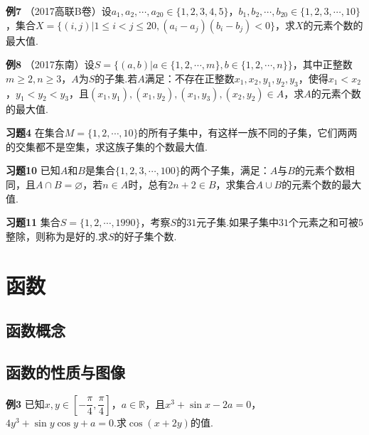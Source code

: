 \documentclass[lang=cn, zihao=4.5]{elegantbook}
\begin{document}
\vspace{30em}
\noindent %
	\textbf{例7} \quad （2017高联B卷）设$a_1,a_2, \cdots ,a_{20} \in \{  1,2,3,4,5  \}$，$b_1,b_2, \cdots ,b_{20} \in \{  1,2,3,\cdots ,10  \}$，集合$X=\{  (i,j)|1 \leq i < j \leq 20 , (a_i-a_j)(b_i-b_j)<0  \}$，求$X$的元素个数的最大值.
	
\newpage
\noindent %
	\textbf{例8} \quad （2017东南）设$S=\{  (a,b)|a \in \{ 1,2,\cdots ,m \},b \in \{ 
1,2, \cdots ,n \}  \}$，其中正整数$m \geq 2,n \geq 3$，$A$为$S$的子集.若$A$满足：不存在正整数$x_1,x_2,y_1,y_2,y_3$，使得$x_1 < x_2$，$y_1 < y_2 < y_3$，且$(x_1,y_1),(x_1,y_2),(x_1,y_3),(x_2,y_2) \in A$，求$A$的元素个数的最大值.

\vspace{30em}
\noindent %
	\textbf{习题4} \quad 在集合$M = \{  1,2,\cdots ,10  \}$的所有子集中，有这样一族不同的子集，它们两两的交集都不是空集，求这族子集的个数最大值.
	
\newpage
\noindent %
	\textbf{习题10} \quad 已知$A$和$B$是集合$\{  1,2,3, \cdots ,100  \}$的两个子集，满足：$A$与$B$的元素个数相同，且$A \cap B = \varnothing$，若$n \in A$时，总有$2n+2 \in B$，求集合$A \cup B$的元素个数的最大值.

\vspace{30em}
\noindent %
	\textbf{习题11} \quad 集合$S=\{  1,2, \cdots ,1990  \}$，考察$S$的$31$元子集.如果子集中$31$个元素之和可被$5$整除，则称为是好的.求$S$的好子集个数.





\chapter{函数}
\section{函数概念}
\section{函数的性质与图像}

\noindent %
	\textbf{例3} \quad 已知$x,y \in \left[ -\dfrac{\pi}{4},\dfrac{\pi}{4} \right]$，$a \in \mathbb{R}$，且$x^3+\sin x -2a = 0$，$4y^3 + \sin y \cos y + a=0$.求$\cos (x+2y)$的值.
	
\end{document}
